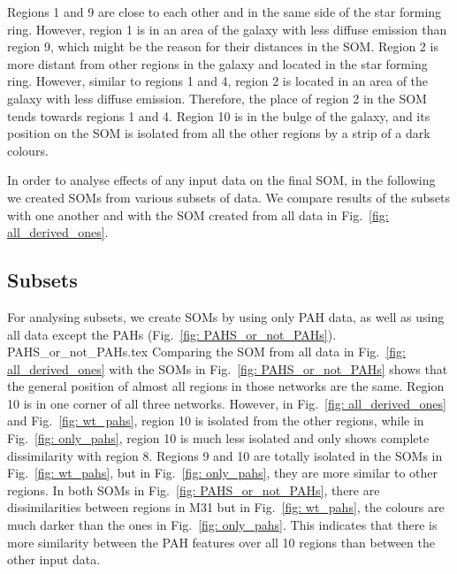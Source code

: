     Regions 1 and 9 are close to each other and in the same side of the star forming ring. 
    However, region 1 is in an area of the galaxy with less diffuse \halpha emission than region 9, which might be the reason for their distances in the SOM.
    Region 2 is more distant from other regions in the galaxy and located in the star forming ring.
    However, similar to regions 1 and 4, region 2 is located in an area of the galaxy with less diffuse \halpha emission.
    Therefore, the place of region 2 in the SOM tends towards regions 1 and 4. 
    Region 10 is in the bulge of the galaxy, and its position on the SOM is isolated from all the other regions by a strip of a dark colours. 
    
    In order to analyse effects of any input data on the final SOM, in the following we created SOMs from various subsets of data.
    We compare results of the subsets with one another and with the SOM created from all data in Fig.~\ref{fig: all_derived_ones}.

    \subsection{Subsets}
    \label{sec: subsets}
    
            For analysing subsets, we create SOMs by using only PAH data, as well as using all data except the PAHs (Fig.~\ref{fig: PAHS_or_not_PAHs}).
             {PAHS_or_not_PAHs.tex}
            Comparing the SOM from all data in Fig.~\ref{fig: all_derived_ones} with the SOMs in Fig.~\ref{fig: PAHS_or_not_PAHs} shows that the general position of almost all regions in those networks are the same. 
            Region 10 is in one corner of all three networks.
            However, in Fig.~\ref{fig: all_derived_ones} and Fig.~\ref{fig: wt_pahs}, region 10 is isolated from the other regions, while in Fig.~\ref{fig: only_pahs}, region 10 is much less isolated and only shows complete dissimilarity with region 8.
            Regions 9 and 10 are totally isolated in the SOMs in Fig.~\ref{fig: wt_pahs}, but in Fig.~\ref{fig: only_pahs}, they are more similar to other regions.
            In both SOMs in Fig.~\ref{fig: PAHS_or_not_PAHs}, there are dissimilarities between regions in M31 but in Fig.~\ref{fig: wt_pahs}, the colours are much darker than the ones in Fig.~\ref{fig: only_pahs}.
            This indicates that there is more similarity between the PAH features over all 10 regions than between the other input data.
            
